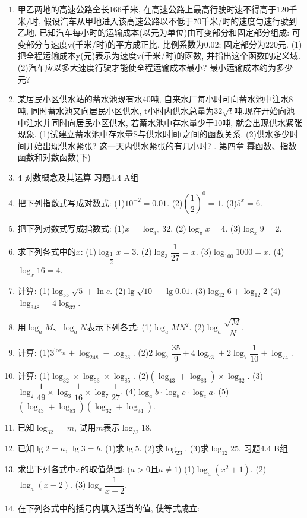 \documentclass[10pt,a4paper]{article}
\begin{document}
\begin{enumerate}[1.]
\item 甲乙两地的高速公路全长166千米, 在高速公路上最高行驶时速不得高于120千米/时, 假设汽车从甲地进入该高速公路以不低于70千米/时的速度匀速行驶到乙地, 已知汽车每小时的运输成本(以元为单位)由可变部分和固定部分组成: 可变部分与速度v(千米/时)的平方成正比, 比例系数为0.02; 固定部分为220元.
(1)把全程运输成本y(元)表示为速度v(千米/时)的函数, 并指出这个函数的定义域.
(2)汽车应以多大速度行驶才能使全程运输成本最小? 最小运输成本约为多少元?
\item 某居民小区供水站的蓄水池现有水40吨, 自来水厂每小时可向蓄水池中注水8吨, 同时蓄水池又向居民小区供水, t小时内供水总量为$32\sqrt t$吨.现在开始向池中注水并同时向居民小区供水, 若蓄水池中存水量少于10吨, 就会出现供水紧张现象.
(1)试建立蓄水池中存水量S与供水时间t之间的函数关系.
(2)供水多少时间开始出现供水紧张? 这一天内供水紧张的有几小时?
.
第四章  幂函数、指数函数和对数函数(下)
\item 4  对数概念及其运算
习题4.4  A组
\item 把下列指数式写成对数式:
(1)$10^{-2}=0.01$.						(2)$(\dfrac 12)^0=1$.
(3)$5^x=6$.
\item 把下列对数式写成指数式:
(1)$x=\log _{16}32$.					(2)$\log _{\pi }x=4$.
(3)$\log _x9=2$.
\item 求下列各式中的$x$:
(1)$\log _{\dfrac 12}x=3$.						(2)$\log _3\dfrac 1{27}=x$.
(3)$\log _{100}1000=x$.					(4)$\log _x16=4$.
\item 计算:
(1)$\log _55\sqrt 5+\ln e$.					(2)$\lg \sqrt {10}-\lg 0.01$.
(3)$\log _{12}6+\log _{12}2$					(4)$\log _348-4\log _32$.
\item 用$\log _aM$、$\log _aN$表示下列各式:
(1)$\log _aMN^2$.						(2)$\log _a\dfrac{\sqrt M}N$.
\item 计算:
(1)$3^{\log _31}+\log _248-\log _23$.
(2)$2\log _7\dfrac{35}9+4\log _73+2\log _7\dfrac 1{10}+\log _74$.
\item 计算:
(1)$\log _32\times \log _53\times \log _85$.			(2)$(\log _43+\log _83)\times \log _32$.
(3)$\log _2\dfrac 1{49}\times \log _3\dfrac 1{16}\times \log _7\dfrac 1{27}$.		(4)$\log _ab\cdot \log _bc\cdot \log _ca$.
(5)$(\log _43+\log _83)(\log _32+\log _94)$.
\item 已知$\log _32=m$, 试用$m$表示$\log _{32}18$.
\item 已知$\lg 2=a$, $\lg 3=b$.
(1)求$\lg 5$.
(2)求$\log _23$.
(3)求$\log _{12}25$.
习题4.4  B组
\item 求出下列各式中$x$的取值范围: ($a>0$且$a\ne 1$)
(1)$\log _a(x^2+1)$.					(2)$\log _a(x-2)$.
(3)$\log _a\dfrac 1{x+2}$.
\item 在下列各式中的括号内填入适当的值, 使等式成立:

\end{enumerate}
\end{document}
